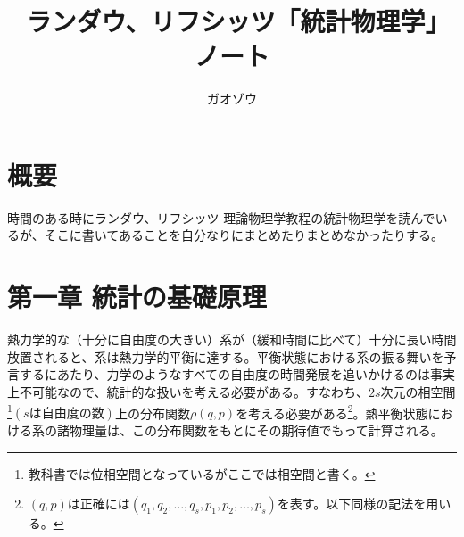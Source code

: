 \documentclass[uplatex,dvipdfmx]{jsarticle}
\title{ランダウ、リフシッツ「統計物理学」　ノート}
\author{ガオゾウ}
\begin{document}
\maketitle
\section*{概要}
    時間のある時にランダウ、リフシッツ 理論物理学教程の統計物理学を読んでいるが、そこに書いてあることを自分なりにまとめたりまとめなかったりする。

\section{第一章 統計の基礎原理}
    熱力学的な（十分に自由度の大きい）系が（緩和時間に比べて）十分に長い時間放置されると、系は熱力学的平衡に達する。平衡状態における系の振る舞いを予言するにあたり、力学のようなすべての自由度の時間発展を追いかけるのは事実上不可能なので、統計的な扱いを考える必要がある。すなわち、$2s$次元の相空間\footnote{教科書では位相空間となっているがここでは相空間と書く。}$(sは自由度の数)$上の分布関数$\rho(q,p)$を考える必要がある\footnote{$(q,p)$は正確には$(q_1,q_2, \dots ,q_s, p_1, p_2, \dots, p_s)$を表す。以下同様の記法を用いる。}。熱平衡状態における系の諸物理量は、この分布関数をもとにその期待値でもって計算される。
\end{document}
